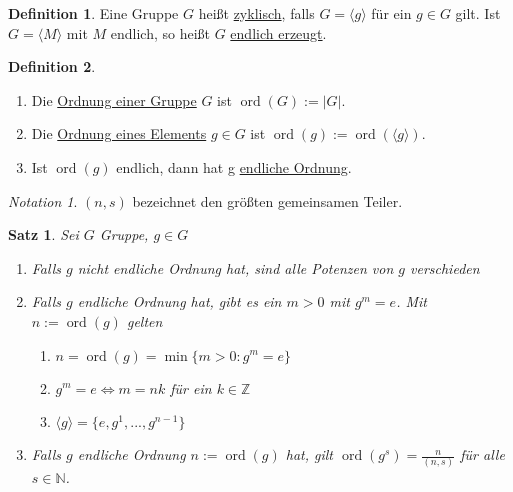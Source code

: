 \documentclass[12pt]{scrartcl} %
\DeclareMathOperator{\ord}{ord}
\newtheorem{thm}{Satz}
\theoremstyle{definition}
\newtheorem*{defn}{Definition}
\theoremstyle{remark}
\newtheorem*{notation}{Notation}
\begin{document}
\begin{defn}
	Eine Gruppe $G$ heißt \underline{zyklisch}, falls $G = \langle g \rangle$ für ein $g \in G$ gilt. \newline
	Ist $G = \langle M \rangle$ mit $M$ endlich, so heißt $G$ \underline{endlich erzeugt}.
\end{defn}

\begin{defn}
	\begin{enumerate}[label=(\roman*)]
	\item Die \underline{Ordnung einer Gruppe} $G$ ist $\ord(G):=\vert G \vert$.
	\item Die \underline{Ordnung eines Elements} $g \in G$ ist $\ord(g):=\ord(\langle g \rangle)$.
	\item Ist $\ord(g)$ endlich, dann hat g \underline{endliche Ordnung}.
	\end{enumerate}
\end{defn}

\begin{notation}
	$(n,s)$ bezeichnet den größten gemeinsamen Teiler.
\end{notation}

\begin{thm}
	Sei $G$ Gruppe, $g \in G$
	\begin{enumerate}
	\item Falls \(g\) nicht endliche Ordnung hat, sind alle Potenzen von \(g\) verschieden
	\item Falls \(g\) endliche Ordnung hat, gibt es ein \(m > 0\) mit \(g^m = e\).
		Mit \(n := \ord(g)\) gelten
		\begin{enumerate}[label=(\alph*)]
		\item $n = \ord(g) = \min \lbrace m>0 : g^{m}=e \rbrace$
		\item $g^{m}=e \Longleftrightarrow m=nk$ für ein $k \in \mathbb{Z}$
		\item $\langle g \rangle = \lbrace e, g^{1},...,g^{n-1}\rbrace$
		\end{enumerate}
	\item Falls \(g\) endliche Ordnung $n := \ord(g)$ hat, gilt $\ord(g^{s}) = \frac{n}{(n,s)}$ für alle \(s \in \mathbb N\).
	\end{enumerate}
\end{thm}
\end{document}
